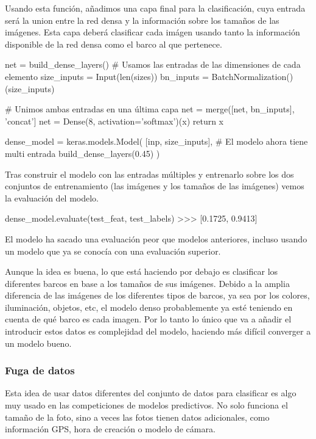 Usando esta función, añadimos una capa final para la clasificación, cuya entrada
será la union entre la red densa y la información sobre los tamaños de las
imágenes. Esta capa deberá clasificar cada imágen usando tanto la información
disponible de la red densa como el barco al que pertenece.

\begin{python}
net = build_dense_layers()
# Usamos las entradas de las dimensiones de cada elemento
size_inputs = Input(len(sizes))
bn_inputs = BatchNormalization()(size_inputs)

# Unimos ambas entradas en una última capa
net = merge([net, bn_inputs], 'concat']
net = Dense(8, activation='softmax')(x)
return x


dense_model = keras.models.Model(
    [inp, size_inputs],  # El modelo ahora tiene multi entrada
    build_dense_layers(0.45)
)
\end{python}

Tras construir el modelo con las entradas múltiples y entrenarlo sobre los dos conjuntos de entrenamiento (las imágenes y los tamaños de las imágenes) vemos la evaluación del modelo.

\begin{python}
dense_model.evaluate(test_feat, test_labels)
>>> [0.1725, 0.9413]
\end{python}

El modelo ha sacado una evaluación peor que modelos anteriores, incluso usando un modelo que ya se conocía con una evaluación superior.

Aunque la idea es buena, lo que está haciendo por debajo es clasificar los diferentes barcos en base a los tamaños de sus imágenes. Debido a la amplia diferencia de las imágenes de los diferentes tipos de barcos, ya sea por los colores, iluminación, objetos, etc, el modelo denso probablemente ya esté teniendo en cuenta de qué barco es cada imagen. Por lo tanto lo único que va a añadir el introducir estos datos es complejidad del modelo, haciendo más difícil converger a un modelo bueno.

\subsubsection{Fuga de datos}

Esta idea de usar datos diferentes del conjunto de datos para clasificar es algo muy usado en las competiciones de modelos predictivos. No solo funciona el tamaño de la foto, sino a veces las fotos tienen datos adicionales, como información GPS, hora de creación o modelo de cámara.

